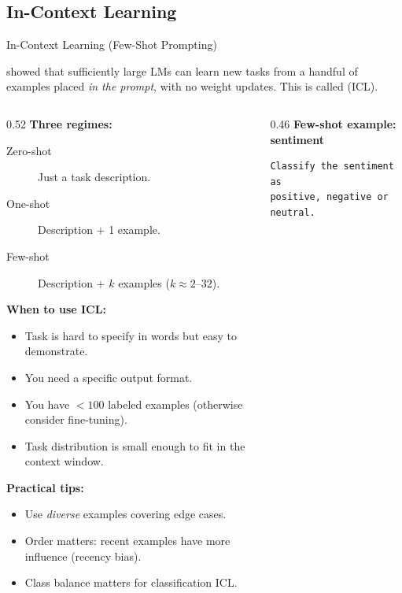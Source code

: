 \subsection{In-Context Learning}

\begin{frame}[fragile]{In-Context Learning (Few-Shot Prompting)}

  \cite{brown2020gpt3} showed that sufficiently large LMs can learn new tasks from
  a handful of examples placed \emph{in the prompt}, with no weight updates.
  This is called  (ICL).

  \vspace{0.3em}
  \begin{columns}
    \begin{column}{0.52\textwidth}
      \textbf{Three regimes:}
      \begin{description}
        \item[Zero-shot] Just a task description.
        \item[One-shot] Description $+$ 1 example.
        \item[Few-shot] Description $+$ $k$ examples ($k \approx 2\text{--}32$).
      \end{description}

      \vspace{0.3em}
      \textbf{When to use ICL:}
      \begin{itemize}[nosep]
        \item Task is hard to specify in words but easy to demonstrate.
        \item You need a specific output format.
        \item You have $<\!\!100$ labeled examples (otherwise consider fine-tuning).
        \item Task distribution is small enough to fit in the context window.
      \end{itemize}

      \vspace{0.3em}
      \textbf{Practical tips:}
      \begin{itemize}[nosep]
        \item Use \emph{diverse} examples covering edge cases.
        \item Order matters: recent examples have more influence (recency bias).
        \item Class balance matters for classification ICL.
      \end{itemize}
    \end{column}
    \begin{column}{0.46\textwidth}
      {\scriptsize\textbf{Few-shot example: sentiment}}
\begin{lstlisting}[basicstyle=\scriptsize\ttfamily, frame=single, backgroundcolor=\color{blue!4}, rulecolor=\color{blue!40!black}, keywordstyle={}, commentstyle={}, stringstyle={}, xleftmargin=0.3em, xrightmargin=0.3em, mathescape=false]
Classify the sentiment as
positive, negative or neutral.


\end{lstlisting}
\end{column}
\end{columns}
\end{frame}
